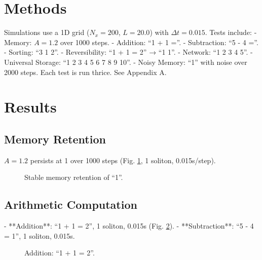 \documentclass[11pt]{article}
\begin{document}
\section{Methods}
Simulations use a 1D grid (\(N_x = 200\), \(L = 20.0\)) with \(\Delta t = 0.015\). Tests include:
- Memory: \(A = 1.2\) over 1000 steps.
- Addition: ``1 + 1 =''.
- Subtraction: ``5 - 4 =''.
- Sorting: ``3 1 2''.
- Reversibility: ``1 + 1 = 2'' → ``1 1''.
- Network: ``1 2 3 4 5''.
- Universal Storage: ``1 2 3 4 5 6 7 8 9 10''.
- Noisy Memory: ``1'' with noise over 2000 steps. Each test is run thrice. See Appendix A.

\section{Results}
\subsection{Memory Retention}
\(A = 1.2\) persists at 1 over 1000 steps (Fig. \ref{fig:memory}, 1 soliton, 0.015s/step).
\begin{figure}[h]
    \centering
    \caption{Stable memory retention of ``1''.}
    \label{fig:memory}
\end{figure}

\subsection{Arithmetic Computation}
- **Addition**: ``1 + 1 = 2'', 1 soliton, 0.015s (Fig. \ref{fig:add}).
- **Subtraction**: ``5 - 4 = 1'', 1 soliton, 0.015s.
\begin{figure}[h]
    \centering
    \caption{Addition: ``1 + 1 = 2''.}
    \label{fig:add}
\end{figure}
\end{document}

